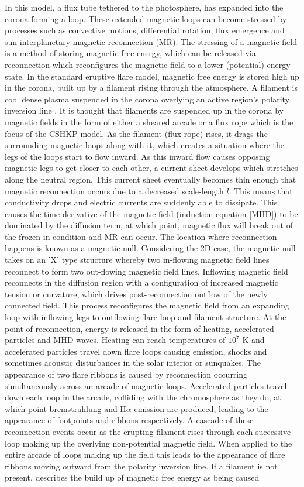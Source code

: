 In this model, a flux tube tethered to the photosphere, has expanded into the corona forming a loop. These extended magnetic loops can become stressed by processes such as convective motions, differential rotation, flux emergence and sun-interplanetary magnetic reconnection (MR). The stressing of a magnetic field is a method of storing magnetic free energy, which can be released via reconnection which reconfigures the magnetic field to a lower (potential) energy state. In the standard eruptive flare model, magnetic free energy is stored high up in the corona, built up by a filament rising through the atmosphere. A filament is cool dense plasma suspended in the corona overlying an active region's polarity inversion line \citep{1955ApJ...121..349B}. It is thought that filaments are suspended up in the corona by magnetic fields in the form of either a sheared arcade or a flux rope which is the focus of the CSHKP model. As the filament (flux rope) rises, it drags the surrounding magnetic loops along with it, which creates a situation where the legs of the loops start to flow inward. As this inward flow causes opposing magnetic legs to get closer to each other, a current sheet develops which stretches along the neutral region. This current sheet eventually becomes thin enough that magnetic reconnection occurs due to a decreased scale-length $l$. This means that conductivity drops and electric currents are suddenly able to dissipate. This causes the time derivative of the magnetic field (induction equation \ref{MHD}) to be dominated by the diffusion term, at which point, magnetic flux will break out of the frozen-in condition and MR can occur. The location where reconnection happens is known as a magnetic null. Considering the 2D case, the magnetic null takes on an 'X' type structure whereby two in-flowing magnetic field lines reconnect to form two out-flowing magnetic field lines. Inflowing magnetic field reconnects in the diffusion region with a configuration of increased magnetic tension or curvature, which drives post-reconnection outflow of the newly connected field. This process reconfigures the magnetic field from an expanding loop with inflowing legs to outflowing flare loop and filament structure. At the point of reconnection, energy is released in the form of heating, accelerated particles and MHD waves. Heating can reach temperatures of $10^7$ K and accelerated particles travel down flare loops causing emission, shocks and sometimes acoustic disturbances in the solar interior or sunquakes. The appearance of two flare ribbons is caused by reconnection occurring simultaneously across an arcade of magnetic loops. Accelerated particles travel down each loop in the arcade, colliding with the chromosphere as they do, at which point bremstrahlung and H$\alpha$ emission are produced, leading to the appearance of footpoints and ribbons respectively. A cascade of these reconnection events occur as the erupting filament rises through each successive loop making up the overlying non-potential magnetic field. When applied to the entire arcade of loops making up the field this leads to the appearance of flare ribbons moving outward from the polarity inversion line. If a filament is not present, \cite{2005psci.book.....A} describes the build up of magnetic free energy as being caused 